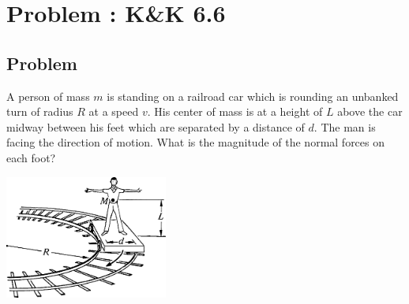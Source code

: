 \documentclass[solutions]{esg8012pset}
\begin{document}
\section{Problem \thesection: K\&K 6.6}
\subsection{Problem}
  A person of mass $m$ is standing on a railroad car which is rounding an unbanked turn of radius $R$ at a speed $v$. His center of mass is at a height of $L$ above the car midway between his feet which are separated by a distance of $d$. The man is facing the direction of motion. What is the magnitude of the normal forces on each foot?
  \begin{center}\includegraphics[width=0.4\textwidth]{ps08_3}\end{center}
\end{document}
